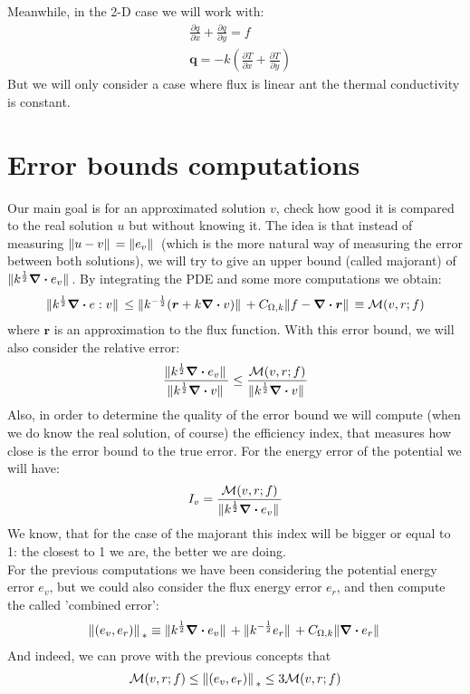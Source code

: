 \documentclass{article}
\begin{document}
    Meanwhile, in the 2-D case we will work with:
    \begin{align*}
        &\frac{\partial q}{\partial x} + \frac{\partial q}{\partial y}  = f \\
        &\bm{q} = -k \left( \frac{\partial T}{\partial x} + \frac{\partial T}{\partial y}\right)
    \end{align*}
    But we will only consider a case where flux is linear ant the thermal conductivity is constant.
    
    \section*{\large{Error bounds computations}}
    Our main goal is for an approximated solution $v$, check how good it is compared to the real solution $u$ but without knowing it. The idea is that instead of measuring $\norm*{u-v} = \norm*{e_v}$ (which is the more natural way of measuring the error between both solutions), we will try to give an upper bound (called majorant) of $\norm*{k^{\frac{1}{2}}\div e_v}$. By integrating the PDE and some more computations we obtain:
    \begin{align*}
        \norm*{k^{\frac{1}{2}}\div e:v} \leq \norm*{k^{-\frac{1}{2}}(\bm{r}+k\div v)} + C_{\Omega,k}\norm*{f-\div \bm{r}} \equiv \mathcal{M}(v,r;f)
    \end{align*}
    where $\bm{r}$ is an approximation to the flux function.
    With this error bound, we will also consider the relative error:
    \begin{align*}
        \frac{\norm*{k^{\frac{1}{2}}\div e_v}}{\norm*{k^{\frac{1}{2}}\div v}} \leq \frac{\mathcal{M}(v,r;f)}{\norm*{k^{\frac{1}{2}}\div v}}
    \end{align*}
    Also, in order to determine the quality of the error bound we will compute (when we do know the real solution, of course) the efficiency index, that measures how close is the error bound to the true error. For the energy error of the potential we will have:
    \begin{align*}
        I_v = \frac{\mathcal{M}(v,r;f)}{\norm*{k^{\frac{1}{2}}\div e_v}}
    \end{align*}
    We know, that for the case of the majorant this index will be bigger or equal to 1: the closest to 1 we are, the better we are doing.\\
    For the previous computations we have been considering the potential energy error $e_v$, but we could also consider the flux energy error $e_r$, and then compute the called 'combined error':
    \begin{align*}
        \norm*{(e_v,e_r)}_{*} \equiv \norm*{k^{\frac{1}{2}}\div e_v} + \norm*{k^{-\frac{1}{2}}e_r} + C_{\Omega,k}\norm*{\div e_r}
    \end{align*} 
    And indeed, we can prove with the previous concepts that 
    \begin{align*}
        \mathcal{M}(v,r;f) \leq  \norm*{(e_v,e_r)}_{*}  \leq 3\mathcal{M}(v,r;f)
    \end{align*}
\end{document}
